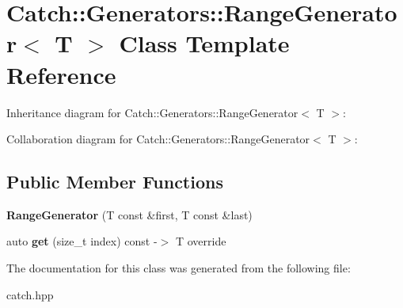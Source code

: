 \hypertarget{classCatch_1_1Generators_1_1RangeGenerator}{}\section{Catch\+:\+:Generators\+:\+:Range\+Generator$<$ T $>$ Class Template Reference}
\label{classCatch_1_1Generators_1_1RangeGenerator}


Inheritance diagram for Catch\+:\+:Generators\+:\+:Range\+Generator$<$ T $>$\+:


Collaboration diagram for Catch\+:\+:Generators\+:\+:Range\+Generator$<$ T $>$\+:
\subsection*{Public Member Functions}
\begin{DoxyCompactItemize}
\item 
{\bfseries Range\+Generator} (T const \&first, T const \&last)\hypertarget{classCatch_1_1Generators_1_1RangeGenerator_a56c5fcc855bdb668d7b93c2017a7c44c}{}\label{classCatch_1_1Generators_1_1RangeGenerator_a56c5fcc855bdb668d7b93c2017a7c44c}

\item 
auto {\bfseries get} (size\+\_\+t index) const -\/$>$ T override\hypertarget{classCatch_1_1Generators_1_1RangeGenerator_a78f7f624b7545823d1a683ebf2ac00e7}{}\label{classCatch_1_1Generators_1_1RangeGenerator_a78f7f624b7545823d1a683ebf2ac00e7}

\end{DoxyCompactItemize}


The documentation for this class was generated from the following file\+:\begin{DoxyCompactItemize}
\item 
catch.\+hpp\end{DoxyCompactItemize}

